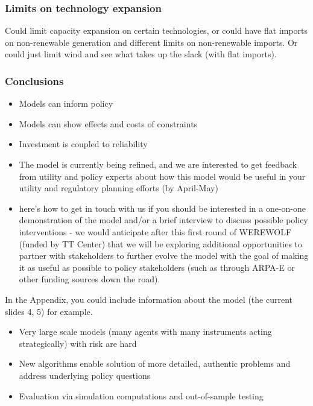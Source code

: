 \documentclass[xcolor=dvipsnames]{beamer}
\begin{document}
\begin{frame}
  \frametitle{Limits on technology expansion}

Could limit capacity expansion on certain technologies, or could have flat imports on non-renewable generation and different limits on non-renewable imports.   Or could just limit wind and see what takes up the slack (with flat imports).
\end{frame}

\begin{frame}
  \frametitle{Conclusions}
  \begin{itemize}
  \item Models can inform policy
  \item Models can show effects and costs of constraints
  \item Investment is coupled to reliability
      \item The model is currently being refined, and we are interested to get feedback from utility and policy experts about how this model would be useful in your utility and regulatory planning efforts (by April-May)
  \item  here's how to get in touch with us if you should be interested in a one-on-one demonstration of the model and/or a brief interview to discuss possible policy interventions - we would anticipate after this first round of WEREWOLF (funded by TT Center) that we will be exploring additional opportunities to partner with stakeholders to further evolve the model with the goal of making it as useful as possible to policy stakeholders (such as through ARPA-E or other funding sources down the road).
  \end{itemize}
\end{frame}

\appendix

\begin{frame}
In the Appendix, you could include information about the model (the
current slides 4, 5) for example.
\begin{itemize}
  \item \color{black} Very large scale models (many agents with many instruments
    acting strategically) with risk are hard
  \item \alert{New algorithms enable solution of more detailed,
      authentic problems and address underlying policy questions}
  \item Evaluation via simulation computations and out-of-sample testing
\end{itemize}
\end{frame}
\end{document}
